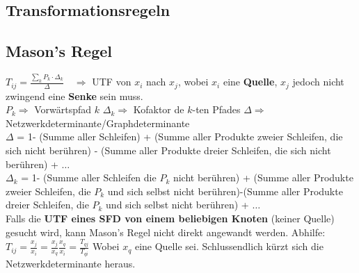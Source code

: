 \subsection{Transformationsregeln }

\subsection{Mason's Regel }
$\boxed{T_{ij} = \frac{\sum\limits_k P_k\cdot\Delta_k}{\Delta}}\quad
\Rightarrow$ UTF von $x_i$ nach $x_j$, wobei \textbf{$x_i$} eine
\textbf{Quelle}, \textbf{$x_j$} jedoch nicht zwingend eine \textbf{Senke} sein
muss. \vspace{0.3cm}\\
$P_k \Rightarrow$ Vorwärtspfad $k$ \qquad $\Delta_k \Rightarrow$ Kofaktor de
$k$-ten Pfades \qquad $\Delta \Rightarrow$ Netzwerkdeterminante/Graphdeterminante\vspace{0.3cm}\\
$\Delta$ = 1- (Summe aller Schleifen) + (Summe aller Produkte zweier
Schleifen, die sich nicht berühren) - (Summe
aller Produkte dreier Schleifen, die sich nicht berühren) + $\ldots$
\vspace{0.3cm}\\
$\Delta_k$ = 1- (Summe aller Schleifen die $P_k$ nicht berühren) + (Summe
aller Produkte zweier Schleifen, die $P_k$ und sich selbst nicht
berühren)-(Summe aller Produkte dreier Schleifen, die $P_k$ und sich selbst
nicht berühren) + $\ldots$ \\

Falls die \textbf{UTF eines SFD von einem beliebigen Knoten} (keiner Quelle)
gesucht wird, kann Mason's Regel nicht direkt angewandt werden. Abhilfe: \\
$T_{ij} = \frac{x_j}{x_i} = \frac{x_j}{x_q} \frac{x_q}{x_i} =
\frac{T_{qj}}{T_{qi}}$ Wobei $x_q$ eine Quelle sei. 
Schlussendlich kürzt sich die Netzwerkdeterminante heraus.


